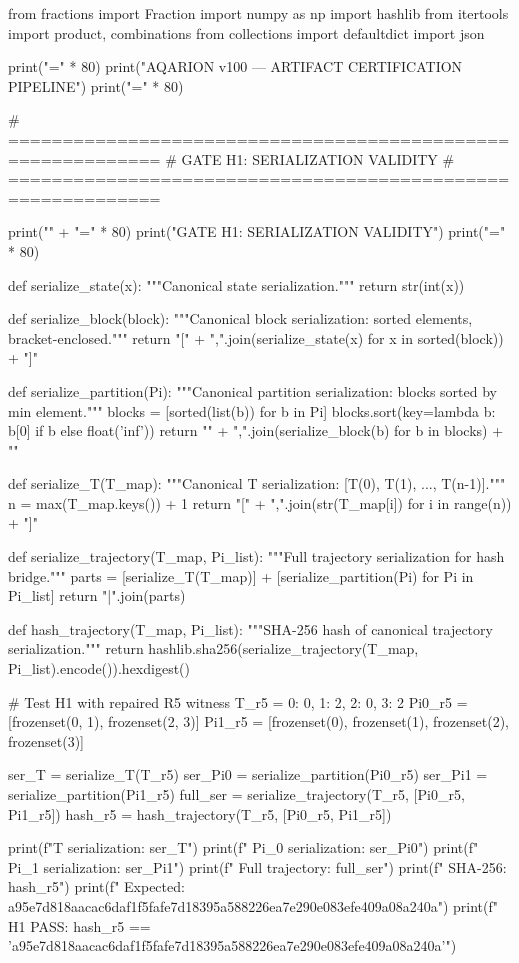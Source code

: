from fractions import Fraction
import numpy as np
import hashlib
from itertools import product, combinations
from collections import defaultdict
import json

print("=" * 80)
print("AQARION v100 — ARTIFACT CERTIFICATION PIPELINE")
print("=" * 80)

# ============================================================
# GATE H1: SERIALIZATION VALIDITY
# ============================================================

print("\n" + "=" * 80)
print("GATE H1: SERIALIZATION VALIDITY")
print("=" * 80)

def serialize_state(x):
    """Canonical state serialization."""
    return str(int(x))

def serialize_block(block):
    """Canonical block serialization: sorted elements, bracket-enclosed."""
    return "[" + ",".join(serialize_state(x) for x in sorted(block)) + "]"

def serialize_partition(Pi):
    """Canonical partition serialization: blocks sorted by min element."""
    blocks = [sorted(list(b)) for b in Pi]
    blocks.sort(key=lambda b: b[0] if b else float('inf'))
    return "{" + ",".join(serialize_block(b) for b in blocks) + "}"

def serialize_T(T_map):
    """Canonical T serialization: [T(0), T(1), ..., T(n-1)]."""
    n = max(T_map.keys()) + 1
    return "[" + ",".join(str(T_map[i]) for i in range(n)) + "]"

def serialize_trajectory(T_map, Pi_list):
    """Full trajectory serialization for hash bridge."""
    parts = [serialize_T(T_map)] + [serialize_partition(Pi) for Pi in Pi_list]
    return "|".join(parts)

def hash_trajectory(T_map, Pi_list):
    """SHA-256 hash of canonical trajectory serialization."""
    return hashlib.sha256(serialize_trajectory(T_map, Pi_list).encode()).hexdigest()

# Test H1 with repaired R5 witness
T_r5 = {0: 0, 1: 2, 2: 0, 3: 2}
Pi0_r5 = [frozenset({0, 1}), frozenset({2, 3})]
Pi1_r5 = [frozenset({0}), frozenset({1}), frozenset({2}), frozenset({3})]

ser_T = serialize_T(T_r5)
ser_Pi0 = serialize_partition(Pi0_r5)
ser_Pi1 = serialize_partition(Pi1_r5)
full_ser = serialize_trajectory(T_r5, [Pi0_r5, Pi1_r5])
hash_r5 = hash_trajectory(T_r5, [Pi0_r5, Pi1_r5])

print(f"\n  T serialization: {ser_T}")
print(f"  Pi_0 serialization: {ser_Pi0}")
print(f"  Pi_1 serialization: {ser_Pi1}")
print(f"  Full trajectory: {full_ser}")
print(f"  SHA-256: {hash_r5}")
print(f"  Expected:  a95e7d818aacac6daf1f5fafe7d18395a588226ea7e290e083efe409a08a240a")
print(f"  H1 PASS: {hash_r5 == 'a95e7d818aacac6daf1f5fafe7d18395a588226ea7e290e083efe409a08a240a'}")

